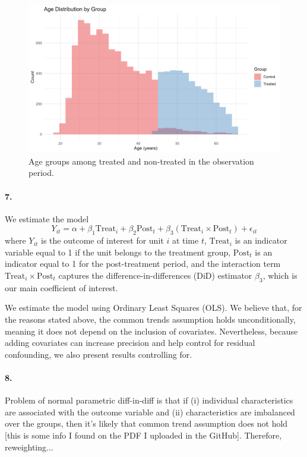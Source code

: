 \documentclass{scrartcl}
\begin{document}
\begin{figure}
    \centering
    \includegraphics[width=0.75\linewidth]{output/figures/final_histogram_age.jpg}
    \caption{Age groups among treated and non-treated in the observation period.}
    \label{fig:age_hist}
\end{figure}

\paragraph*{7.}

We estimate the model
$$
Y_{it} = \alpha + \beta_1 \text{Treat}_i + \beta_2 \text{Post}_t + \beta_3 (\text{Treat}_i \times \text{Post}_t) + \epsilon_{it}
$$
where \( Y_{it} \) is the outcome of interest for unit \( i \) at time \( t \), \( \text{Treat}_i \) is an indicator variable equal to 1 if the unit belongs to the treatment group, \( \text{Post}_t \) is an indicator equal to 1 for the post-treatment period, and the interaction term \( \text{Treat}_i \times \text{Post}_t \) captures the difference-in-differences (DiD) estimator \( \beta_3 \), which is our main coefficient of interest.

We estimate the model using Ordinary Least Squares (OLS). We believe that, for the reasons stated above, the common trends assumption holds unconditionally, meaning it does not depend on the inclusion of covariates. Nevertheless, because adding covariates can increase precision and help control for residual confounding, we also present results controlling for.



\paragraph*{8.}
Problem of normal parametric diff-in-diff is that if (i) individual characteristics are associated with the outcome variable and (ii) characteristics are imbalanced over the groups, then it's likely that common trend assumption does not hold [this is some info I found on the PDF I uploaded in the GitHub]. Therefore, reweighting...
\end{document}
